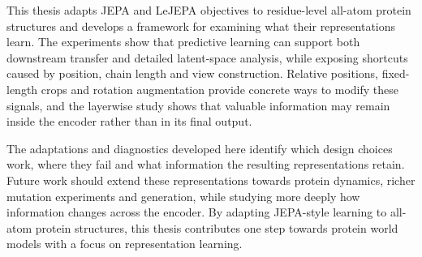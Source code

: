 This thesis adapts JEPA and LeJEPA objectives to residue-level all-atom protein structures and develops a framework for examining what their representations learn. The experiments show that predictive learning can support both downstream transfer and detailed latent-space analysis, while exposing shortcuts caused by position, chain length and view construction. Relative positions, fixed-length crops and rotation augmentation provide concrete ways to modify these signals, and the layerwise study shows that valuable information may remain inside the encoder rather than in its final output.

The adaptations and diagnostics developed here identify which design choices work, where they fail and what information the resulting representations retain. Future work should extend these representations towards protein dynamics, richer mutation experiments and generation, while studying more deeply how information changes across the encoder. By adapting JEPA-style learning to all-atom protein structures, this thesis contributes one step towards protein world models with a focus on representation learning.
